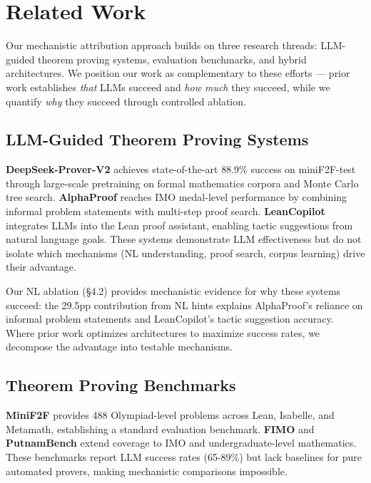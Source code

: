 \section{Related Work}

Our mechanistic attribution approach builds on three research threads: LLM-guided theorem proving systems, evaluation benchmarks, and hybrid architectures. We position our work as complementary to these efforts --- prior work establishes \emph{that} LLMs succeed and \emph{how much} they succeed, while we quantify \emph{why} they succeed through controlled ablation.

\subsection{LLM-Guided Theorem Proving Systems}

\textbf{DeepSeek-Prover-V2} \cite{DeepSeekProverV2_2025} achieves state-of-the-art 88.9\% success on miniF2F-test through large-scale pretraining on formal mathematics corpora and Monte Carlo tree search. \textbf{AlphaProof} \cite{AlphaProof_2024} reaches IMO medal-level performance by combining informal problem statements with multi-step proof search. \textbf{LeanCopilot} \cite{LeanCopilot} integrates LLMs into the Lean proof assistant, enabling tactic suggestions from natural language goals. These systems demonstrate LLM effectiveness but do not isolate which mechanisms (NL understanding, proof search, corpus learning) drive their advantage.

Our NL ablation (\S4.2) provides mechanistic evidence for why these systems succeed: the 29.5pp contribution from NL hints explains AlphaProof's reliance on informal problem statements and LeanCopilot's tactic suggestion accuracy. Where prior work optimizes architectures to maximize success rates, we decompose the advantage into testable mechanisms.

\subsection{Theorem Proving Benchmarks}

\textbf{MiniF2F} \cite{MiniF2F_2021} provides 488 Olympiad-level problems across Lean, Isabelle, and Metamath, establishing a standard evaluation benchmark. \textbf{FIMO} and \textbf{PutnamBench} extend coverage to IMO and undergraduate-level mathematics. These benchmarks report LLM success rates (65-89\%) but lack baselines for pure automated provers, making mechanistic comparisons impossible.

